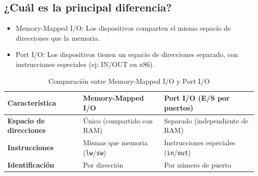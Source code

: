 \documentclass{article}
\begin{document}
\subsection{¿Cuál es la principal diferencia?}
\begin{itemize}
    \item Memory-Mapped I/O: Los dispositivos comparten el mismo espacio de direcciones que la memoria.

    \item Port I/O: Los dispositivos tienen un espacio de direcciones separado, con instrucciones especiales (ej: IN/OUT en x86).
\end{itemize}
\begin{table}[h]
\centering
\begin{tabular}{>{\bfseries}l p{4cm} p{4cm}}
\toprule
{\textbf{Característica}} & \textbf{Memory-Mapped I/O} & \textbf{Port I/O (E/S por puertos)} \\
\midrule
Espacio de direcciones & Único (compartido con RAM) & Separado (independiente de RAM) \\
Instrucciones          & Mismas que memoria (\texttt{lw}/\texttt{sw}) & Instrucciones especiales (\texttt{in}/\texttt{out}) \\
Identificación         & Por dirección & Por número de puerto \\
\bottomrule
\end{tabular}
\caption{Comparación entre Memory-Mapped I/O y Port I/O}
\label{tab:comparacion2}
\end{table}
\end{document}
